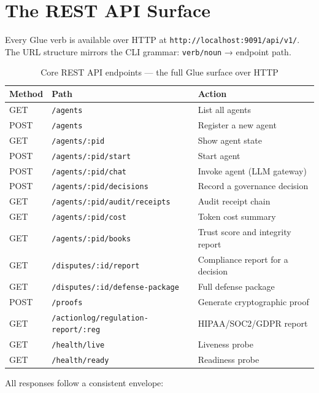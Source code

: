 \section{The REST API Surface}

Every Glue verb is available over HTTP at \texttt{http://localhost:9091/api/v1/}.
The URL structure mirrors the CLI grammar: \texttt{verb/noun} → endpoint path.

\begin{table}[H]
\centering
\renewcommand{\arraystretch}{1.4}
\begin{tabular}{@{}llp{6cm}@{}}
\toprule
\textbf{Method} & \textbf{Path} & \textbf{Action} \\
\midrule
GET  & \texttt{/agents}                & List all agents \\
POST & \texttt{/agents}                & Register a new agent \\
GET  & \texttt{/agents/:pid}           & Show agent state \\
POST & \texttt{/agents/:pid/start}     & Start agent \\
POST & \texttt{/agents/:pid/chat}      & Invoke agent (LLM gateway) \\
POST & \texttt{/agents/:pid/decisions} & Record a governance decision \\
GET  & \texttt{/agents/:pid/audit/receipts} & Audit receipt chain \\
GET  & \texttt{/agents/:pid/cost}      & Token cost summary \\
GET  & \texttt{/agents/:pid/books}     & Trust score and integrity report \\
GET  & \texttt{/disputes/:id/report}   & Compliance report for a decision \\
GET  & \texttt{/disputes/:id/defense-package} & Full defense package \\
POST & \texttt{/proofs}                & Generate cryptographic proof \\
GET  & \texttt{/actionlog/regulation-report/:reg} & HIPAA/SOC2/GDPR report \\
GET  & \texttt{/health/live}           & Liveness probe \\
GET  & \texttt{/health/ready}          & Readiness probe \\
\bottomrule
\end{tabular}
\caption{Core REST API endpoints — the full Glue surface over HTTP}
\end{table}

All responses follow a consistent envelope:

